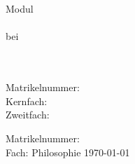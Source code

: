 \ifdefined\layouttitlepage
\thispagestyle{empty}
\begin{titlepage}
\singlespacing

\quad \\[4cm]

\begin{center}
\begin{minipage}{0.9\linewidth}
\begin{center}
\textsc{\MakeLowercase{\autor}} \\[1cm]
{%
    \scshape\Large\onehalfspacing
    \titel \par}
\end{center}
\end{minipage}

\vskip 3.8cm
\emph{\art}
\end{center}

\vfill

\noindent\begin{minipage}{0.5\linewidth}
Modul \emph{\modul} \\
\veranstaltung \\
bei \dozentin \\
\institut \\
\universitaet
\end{minipage}
\begin{minipage}{0.5\linewidth}
\begin{flushright}
\email \\
Matrikelnummer: \matrikelnummer \\
Kernfach:  \\
Zweitfach: \zweitfach \\
\datum
\end{flushright}
\end{minipage}
\end{titlepage}
\fi

\ifdefined\layoutanon
\begin{center}
\noindent\begin{minipage}{0.8\linewidth}
\begin{center}
\emph{\art}
\vskip 1.6cm
{%
    \Large\onehalfspacing
    \titel \par}
\vskip 3.5cm
Matrikelnummer: \matrikelnummer \\
Fach: Philosophie
\vskip 1.5cm
\today
\end{center}
\end{minipage}
\end{center}
\vfill
\fi

